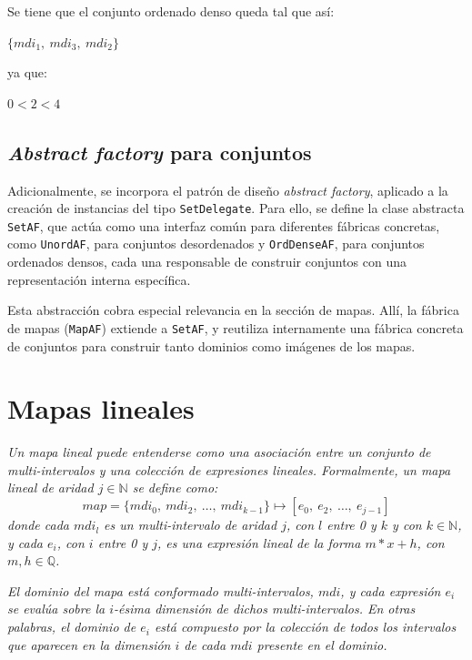 Se tiene que el conjunto ordenado denso queda tal que así:

\begin{center}
    $\{mdi_1,\ mdi_3,\ mdi_2\}$
\end{center}

ya que:

\begin{center}
    $0 < 2 < 4$
\end{center}

\subsection{\textit{Abstract factory} para conjuntos}

Adicionalmente, se incorpora el patrón de diseño \textit{abstract factory}, aplicado a la creación de instancias del tipo \texttt{SetDelegate}. Para ello, se define la clase abstracta \texttt{SetAF}, que actúa como una interfaz común para diferentes fábricas concretas, como \texttt{UnordAF}, para conjuntos desordenados y \texttt{OrdDenseAF}, para conjuntos ordenados densos, cada una responsable de construir conjuntos con una representación interna específica.

Esta abstracción cobra especial relevancia en la sección de mapas. Allí, la fábrica de mapas (\texttt{MapAF}) extiende a \texttt{SetAF}, y reutiliza internamente una fábrica concreta de conjuntos para construir tanto dominios como imágenes de los mapas.

\section{Mapas lineales}

\begin{center}
\textit{
Un mapa lineal puede entenderse como una asociación entre un conjunto de multi-intervalos y una colección de expresiones lineales. Formalmente, un mapa lineal de aridad \( j \in \mathbb{N}\) se define como:
\[
\mathit{map} = \{ \mathit{mdi}_0,\ \mathit{mdi}_2,\ \ldots,\ \mathit{mdi}_{k-1} \} \mapsto [e_0,\ e_2,\ \ldots,\ e_{j-1}]
\]
donde cada $mdi_l$ es un multi-intervalo de aridad \( j \), con $l$ entre 0 y $k$ y con $k \in \mathbb{N}$, y cada \( e_i \), con $i$ entre 0 y $j$, es una expresión lineal de la forma \( m*x + h \), con $m,h \in \mathbb{Q}$.}  

\textit{
El dominio del mapa está conformado multi-intervalos, $mdi$, y cada expresión \( e_i \) se evalúa sobre la \( i \)-ésima dimensión de dichos multi-intervalos. En otras palabras, el dominio de \( e_i \) está compuesto por la colección de todos los intervalos que aparecen en la dimensión \( i \) de cada $mdi$ presente en el dominio.
}
\end{center}

